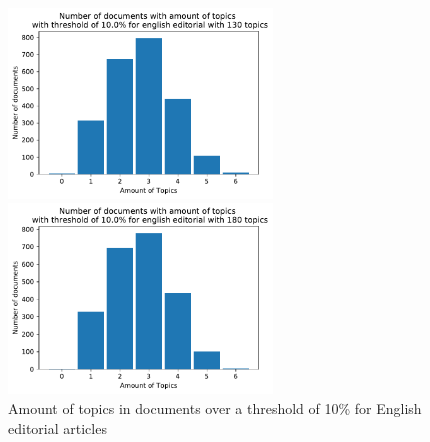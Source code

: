\begin{figure}
\begin{minipage}[t]{0.5\textwidth}
	\end{minipage}
	\begin{minipage}[t]{0.5\textwidth}
		\includegraphics[width=7cm]{gfx/GrafikenFinal/englisheditoriallda_topPerdoc130.pdf}
	\end{minipage}
	\begin{minipage}[t]{0.5\textwidth}
		\includegraphics[width=7cm]{gfx/GrafikenFinal/englisheditoriallda_topPerdoc180.pdf}
	\end{minipage}
	\caption{Amount of topics in documents over a threshold of 10\% for English editorial articles}
	\label{top_per_doc_eng}
\end{figure}

